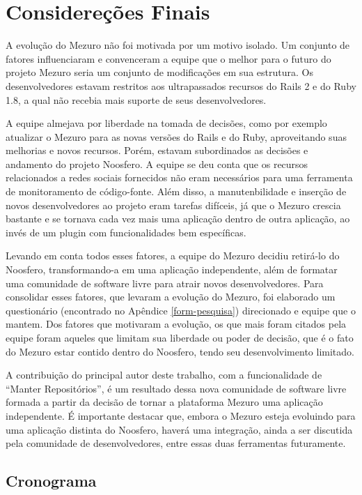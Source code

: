 \chapter{Considereções Finais}

A evolução do Mezuro não foi motivada por um motivo isolado. Um conjunto de fatores influenciaram e convenceram a equipe que o melhor para o futuro do projeto Mezuro seria um conjunto de modificações em sua estrutura. Os desenvolvedores estavam restritos aos ultrapassados recursos do Rails 2 e do Ruby 1.8, a qual não recebia mais suporte de seus desenvolvedores.

A equipe almejava por liberdade na tomada de decisões, como por exemplo atualizar o Mezuro para as novas versões do Rails e do Ruby, aproveitando suas melhorias e novos recursos. Porém, estavam subordinados as decisões e andamento do projeto Noosfero. A equipe se deu conta que os recursos relacionados a redes sociais fornecidos não eram necessários para uma ferramenta de monitoramento de código-fonte. Além disso, a manutenbilidade e inserção de novos desenvolvedores ao projeto eram tarefas difíceis, já que o Mezuro crescia bastante e se tornava cada vez mais uma aplicação dentro de outra aplicação, ao invés de um plugin com funcionalidades bem específicas.

Levando em conta todos esses fatores, a equipe do Mezuro decidiu retirá-lo do Noosfero, transformando-a em uma aplicação independente, além de formatar uma comunidade de software livre para atrair novos desenvolvedores. Para consolidar esses fatores, que levaram a evolução do Mezuro, foi elaborado um questionário (encontrado no Apêndice \ref{form-pesquisa}) direcionado e equipe que o mantem. Dos fatores que motivaram a evolução, os que mais foram citados pela equipe foram aqueles que limitam sua liberdade ou poder de decisão, que é o fato do Mezuro estar contido dentro do Noosfero, tendo seu desenvolvimento limitado.

A contribuição do principal autor deste trabalho, com a funcionalidade de   ``Manter Repositórios'', é um resultado dessa nova comunidade de software livre formada a partir da decisão de tornar a plataforma Mezuro uma aplicação independente. É importante destacar que, embora o Mezuro esteja evoluindo para uma aplicação distinta do Noosfero, haverá uma integração, ainda a ser discutida pela comunidade de desenvolvedores, entre essas duas ferramentas futuramente.

\section{Cronograma}

